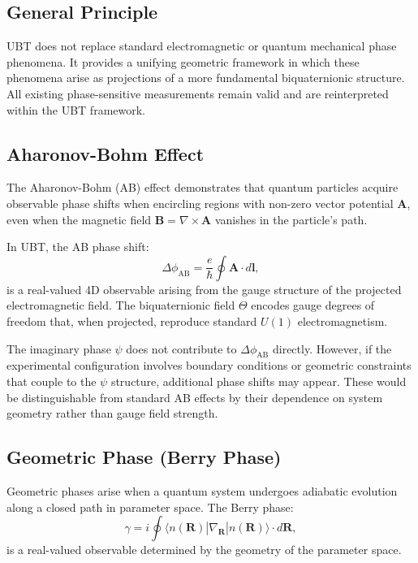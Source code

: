 \documentclass[12pt]{article}
\begin{document}
\subsection{General Principle}

UBT does not replace standard electromagnetic or quantum mechanical phase phenomena. It provides a unifying geometric framework in which these phenomena arise as projections of a more fundamental biquaternionic structure. All existing phase-sensitive measurements remain valid and are reinterpreted within the UBT framework.

\subsection{Aharonov-Bohm Effect}

The Aharonov-Bohm (AB) effect demonstrates that quantum particles acquire observable phase shifts when encircling regions with non-zero vector potential $\mathbf{A}$, even when the magnetic field $\mathbf{B} = \nabla \times \mathbf{A}$ vanishes in the particle's path.

In UBT, the AB phase shift:
\begin{equation}
\Delta\phi_{\text{AB}} = \frac{e}{\hbar} \oint \mathbf{A} \cdot d\mathbf{l},
\end{equation}
is a real-valued 4D observable arising from the gauge structure of the projected electromagnetic field. The biquaternionic field $\Theta$ encodes gauge degrees of freedom that, when projected, reproduce standard $U(1)$ electromagnetism.

The imaginary phase $\psi$ does not contribute to $\Delta\phi_{\text{AB}}$ directly. However, if the experimental configuration involves boundary conditions or geometric constraints that couple to the $\psi$ structure, additional phase shifts may appear. These would be distinguishable from standard AB effects by their dependence on system geometry rather than gauge field strength.

\subsection{Geometric Phase (Berry Phase)}

Geometric phases arise when a quantum system undergoes adiabatic evolution along a closed path in parameter space. The Berry phase:
\begin{equation}
\gamma = i \oint \langle n(\mathbf{R}) | \nabla_{\mathbf{R}} | n(\mathbf{R}) \rangle \cdot d\mathbf{R},
\end{equation}
is a real-valued observable determined by the geometry of the parameter space.
\end{document}
